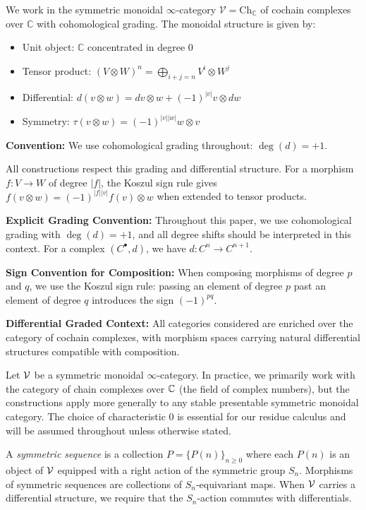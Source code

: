 \begin{definition}
We work in the symmetric monoidal $\infty$-category $\mathcal{V} = \text{Ch}_\mathbb{C}$ of 
cochain complexes over $\mathbb{C}$ with cohomological grading. The monoidal structure is given by:
\begin{itemize}
\item Unit object: $\mathbb{C}$ concentrated in degree 0
\item Tensor product: $(V \otimes W)^n = \bigoplus_{i+j=n} V^i \otimes W^j$
\item Differential: $d(v \otimes w) = dv \otimes w + (-1)^{|v|}v \otimes dw$
\item Symmetry: $\tau(v \otimes w) = (-1)^{|v||w|}w \otimes v$
\end{itemize}
\textbf{Convention:} We use cohomological grading throughout: $\deg(d) = +1$.

All constructions respect this grading and differential structure. For a morphism $f: V \to W$ of degree $|f|$, the Koszul sign rule gives $f(v \otimes w) = (-1)^{|f||v|}f(v) \otimes w$ when extended to tensor products.

\textbf{Explicit Grading Convention:} Throughout this paper, we use cohomological grading with $\deg(d) = +1$, and all degree shifts should be interpreted in this context. For a complex $(C^\bullet, d)$, we have $d: C^n \to C^{n+1}$.

\textbf{Sign Convention for Composition:} When composing morphisms of degree $p$ and $q$, we use the Koszul sign rule: passing an element of degree $p$ past an element of degree $q$ introduces the sign $(-1)^{pq}$.

\textbf{Differential Graded Context:} All categories considered are enriched over the category of cochain complexes, with morphism spaces carrying natural differential structures compatible with composition.

\end{definition}

Let $\mathcal{V}$ be a symmetric monoidal $\infty$-category. In practice, we primarily work with the category of chain complexes over $\mathbb{C}$ (the field of complex numbers), but the constructions apply more generally to any stable presentable symmetric monoidal category. The choice of characteristic 0 is essential for our residue calculus and will be assumed throughout unless otherwise stated.
 
\begin{definition}
A \emph{symmetric sequence} is a collection $P = \{P(n)\}_{n \geq 0}$ where each $P(n)$ is an object of $\mathcal{V}$ equipped with a right action of the symmetric group $S_n$. Morphisms of symmetric sequences are collections of $S_n$-equivariant maps. When $\mathcal{V}$ carries a differential structure, we require that the $S_n$-action commutes with differentials.
\end{definition}
 
